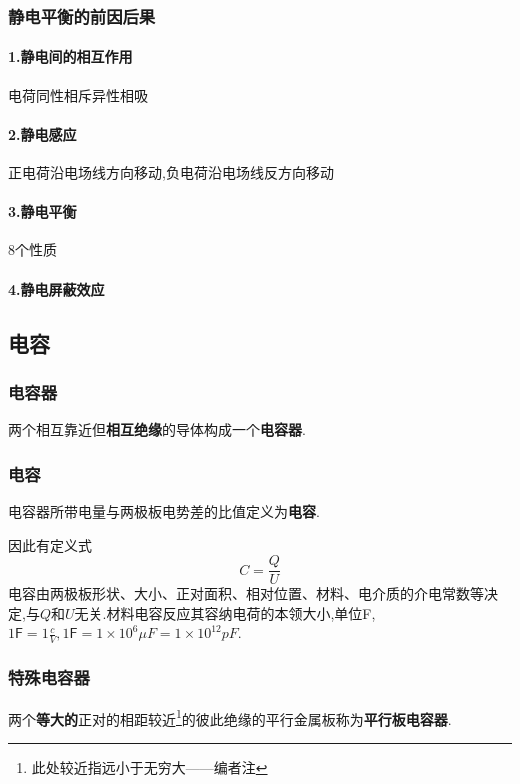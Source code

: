 \subsubsection{静电平衡的前因后果}
\paragraph{1.静电间的相互作用}\qquad 电荷同性相斥异性相吸 
\paragraph{2.静电感应}\qquad 正电荷沿电场线方向移动,负电荷沿电场线反方向移动 
\paragraph{3.静电平衡}\qquad 8个性质 
\paragraph{4.静电屏蔽效应}\qquad
\subsection{电容}
\subsubsection{电容器}
\begin{de}两个相互靠近但\textbf{相互绝缘}的导体构成一个\textbf{电容器}.\end{de}
\subsubsection{电容}
\begin{de}电容器所带电量与两极板电势差的比值定义为\textbf{电容}.\end{de}


因此有定义式\begin{equation}
	C=\frac{Q}{U}
\end{equation}
电容由两极板形状、大小、正对面积、相对位置、材料、电介质的介电常数等决定,与$Q$和$U$无关.材料电容反应其容纳电荷的本领大小,单位\textsf{F},$1\textsf{F}=1\frac{c}{V}, 1\textsf{F}=1\times10^6\mu F=1\times10^{12}pF.$
\subsubsection{特殊电容器}
两个\textbf{等大的}正对的相距较近\footnote{此处较近指远小于无穷大——编者注}的彼此绝缘的平行金属板称为\textbf{平行板电容器}.
